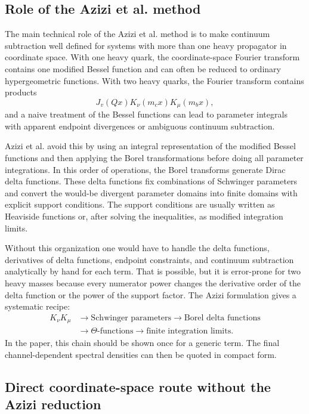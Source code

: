 \documentclass[11pt]{article}
\begin{document}
\subsection{Role of the Azizi et al. method}

The main technical role of the Azizi et al. method is to make continuum
subtraction well defined for systems with more than one heavy propagator in
coordinate space.  With one heavy quark, the coordinate-space Fourier
transform contains one modified Bessel function and can often be reduced to
ordinary hypergeometric functions.  With two heavy quarks, the Fourier
transform contains products
\begin{equation}
  J_v(Qx)K_\nu(m_cx)K_\mu(m_bx),
\end{equation}
and a naive treatment of the Bessel functions can lead to parameter integrals
with apparent endpoint divergences or ambiguous continuum subtraction.

Azizi et al. avoid this by using an integral representation of the modified
Bessel functions and then applying the Borel transformations before doing all
parameter integrations.  In this order of operations, the Borel transforms
generate Dirac delta functions.  These delta functions fix combinations of
Schwinger parameters and convert the would-be divergent parameter domains into
finite domains with explicit support conditions.  The support conditions are
usually written as Heaviside functions or, after solving the inequalities, as
modified integration limits.

Without this organization one would have to handle the delta functions,
derivatives of delta functions, endpoint constraints, and continuum subtraction
analytically by hand for each term.  That is possible, but it is error-prone
for two heavy masses because every numerator power changes the derivative
order of the delta function or the power of the support factor.  The Azizi
formulation gives a systematic recipe:
\begin{align}
  K_\nu K_\mu
  &\longrightarrow
  \text{Schwinger parameters}
  \longrightarrow
  \text{Borel delta functions}
  \nonumber\\
  &\longrightarrow
  \Theta\text{-functions}
  \longrightarrow
  \text{finite integration limits}.
\end{align}
In the paper, this chain should be shown once for a generic term.  The final
channel-dependent spectral densities can then be quoted in compact form.

\subsection{Direct coordinate-space route without the Azizi reduction}
\end{document}
